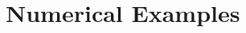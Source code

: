 \documentclass[fleqn,11pt]{amsart}
\begin{document}
\section{Numerical Examples}
\label{sec:numerical}

\end{document}
